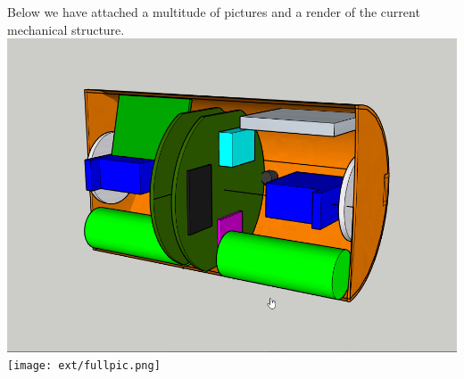 \documentclass[class=report, crop=false]{standalone}
\begin{document}
Below we have attached a multitude of pictures and a render of the current mechanical structure. \\
\includegraphics[width=\columnwidth]{ext/render.png}
\texttt{[image: ext/fullpic.png]}
\end{document}
